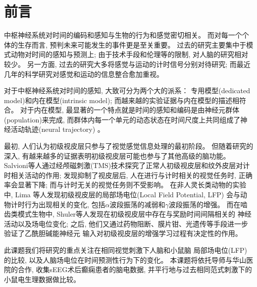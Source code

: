 \chapter{前言}

中枢神经系统对时间的编码和感知与生物的行为和感觉密切相关。
而对每一个个体的生存而言, 预判未来可能发生的事件更是至关重要。
过去的研究主要集中于模式动物对时间的感知与预测上;
由于技术手段和伦理等的限制, 对人脑的研究相对较少。
另一方面, 过去的研究大多将感觉与运动的计时信号分别对待研究;
而最近几年的科学研究对感觉和运动的信息整合愈加重视。

对于中枢神经系统对时间的感知, 大致可分为两个大的派系：
专用模型(dedicated model)和内在模型(intrinsic model);
而越来越的实验证据与内在模型的描述相符合\cite{paton2018neural}。
对于内在模型, 最显著的一个特点就是时间的感知和编码是由神经元群体(population)来完成,
而群体内每一个单元的动态状态在时间尺度上共同组成了神经活动轨迹(neural trajectory)
\cite{buonomano2009state, remington2018dynamical}。

最初, 人们认为初级视皮层只参与了视觉感觉信息处理的最初阶段。
但随着研究的深入, 有越来越多的证据表明初级视皮层可能也参与了其他高级的脑功能。
Salvioni等人通过经颅磁刺激(TMS)技术探究了正常人初级视皮层和纹外皮层对计时相关活动的作用;
发现抑制了视皮层后, 人在进行与计时相关的视觉任务时,
正确率会显著下降; 而与计时无关的视觉任务则不受影响\cite{salvioni2013visual}。
在非人灵长类动物的实验中, Lima 等人发现初级视皮层的局部场电位(Local Field Potential, LFP)
会与动物计时行为出现相关的变化,
包括\(\alpha\)波段振荡的减弱和\(\gamma\)波段振荡的增强\cite{lima2011gamma}。
而在啮齿类模式生物中, Shuler等人发现在初级视皮层中存在与奖励时间间隔相关的
神经活动以及场电位变化\cite{chubykin2013cholinergic, shuler2006reward, zold2015theta};
之后, 他们又通过药物阻断、膜片钳、光遗传等手段进一步验证了乙酰胆碱能神经元
输入对初级视皮层的增强学习过程有决定性的作用\cite{chubykin2013cholinergic, liu2015selective, namboodiri2015visually}。

此课题我们将研究的重点关注在相同视觉刺激下人脑和小鼠脑
局部场电位(LFP)的比较, 以及人脑场电位在时间预测性行为下的变化。
本课题将依托导师与华山医院的合作, 收集sEEG术后癫痫患者的脑电数据,
并平行地与过去相同范式刺激下的小鼠电生理数据做比较。
